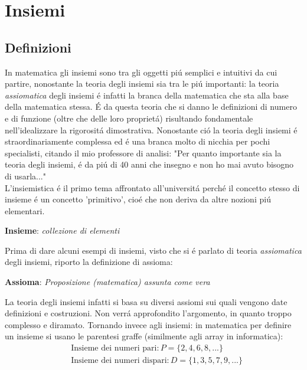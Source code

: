 \documentclass[twoside]{article} %
\begin{document}
	\newpage
	\section{Insiemi}
	
	\subsection{Definizioni}	
	In matematica gli insiemi sono tra gli oggetti pi\'u semplici e intuitivi da cui partire, nonostante la teoria degli insiemi sia tra le pi\'u importanti: la teoria \textit{assiomatica} degli insiemi \'e infatti la branca della matematica che sta alla base della matematica stessa. \'E da questa teoria che si danno le definizioni di numero e di funzione (oltre che delle loro propriet\'a) risultando fondamentale nell'idealizzare la rigorosit\'a dimostrativa. Nonostante ci\'o la teoria degli insiemi \'e straordinariamente complessa ed \'e una branca molto di nicchia per pochi specialisti, citando il mio professore di analisi: "Per quanto importante sia la teoria degli insiemi, \'e da pi\'u di 40 anni che insegno e non ho mai avuto bisogno di usarla..."\\
	L'insiemistica \'e il primo tema affrontato all'universit\'a perch\'e il concetto stesso di insieme \'e un concetto 'primitivo', cio\'e che non deriva da altre nozioni pi\'u elementari.
	\begin{center}
		\textbf{Insieme}: \textit{collezione di elementi}
	\end{center}
	Prima di dare alcuni esempi di insiemi, visto che si \'e parlato di teoria \textit{assiomatica} degli insiemi, riporto la definizione di assioma:
	\begin{center}
		\textbf{Assioma}: \textit{Proposizione (matematica) assunta come vera}
	\end{center}
	La teoria degli insiemi infatti si basa su diversi assiomi sui quali vengono date definizioni e costruzioni. Non verr\'a approfondito l'argomento, in quanto troppo complesso e diramato.
	Tornando invece agli insiemi: in matematica per definire un insieme si usano le parentesi graffe (similmente agli array in informatica):	
	\begin{align*}
			&\text{Insieme dei numeri pari}: P=\{2,4,6,8,...\}\\
			&\text{Insieme dei numeri dispari}: D=\{1,3,5,7,9,...\}
	\end{align*}
\end{document}
